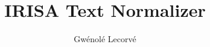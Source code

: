 \documentclass[a4paper,10pt]{report}
\title{IRISA Text Normalizer}
\author{Gwénolé Lecorvé}
\begin{document}
\maketitle

\begin{abstract}
\end{abstract}
\end{document}
